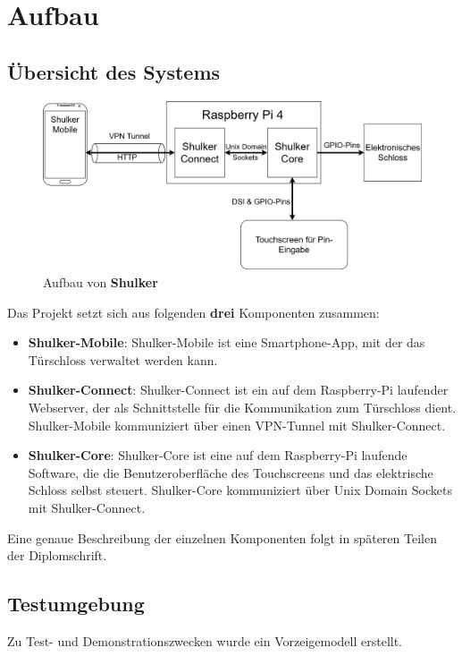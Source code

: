\chapter{Aufbau}

\section{Übersicht des Systems}


\begin{figure}[H]
	\begin{center}
		\includegraphics[width=1\textwidth]{images/Intro/Leitbild.png}
		\caption{Aufbau von \textbf{Shulker}}
	\end{center}
\end{figure}

Das Projekt setzt sich aus folgenden \textbf{drei} Komponenten zusammen:


\begin{itemize}
    \item \textbf{Shulker-Mobile}: Shulker-Mobile ist eine Smartphone-App, mit der das Türschloss verwaltet werden kann.
    \item \textbf{Shulker-Connect}: Shulker-Connect ist ein auf dem Raspberry-Pi laufender Webserver, der als Schnittstelle für die Kommunikation zum Türschloss dient. Shulker-Mobile kommuniziert über einen VPN-Tunnel mit Shulker-Connect.
    \item \textbf{Shulker-Core}: Shulker-Core ist eine auf dem Raspberry-Pi laufende Software, die die Benutzeroberfläche des Touchscreens und das elektrische Schloss selbst steuert. Shulker-Core kommuniziert über Unix Domain Sockets mit Shulker-Connect.
\end{itemize}

Eine genaue Beschreibung der einzelnen Komponenten folgt in späteren Teilen der Diplomschrift. 

\section{Testumgebung}

Zu Test- und Demonstrationszwecken wurde ein Vorzeigemodell erstellt.
